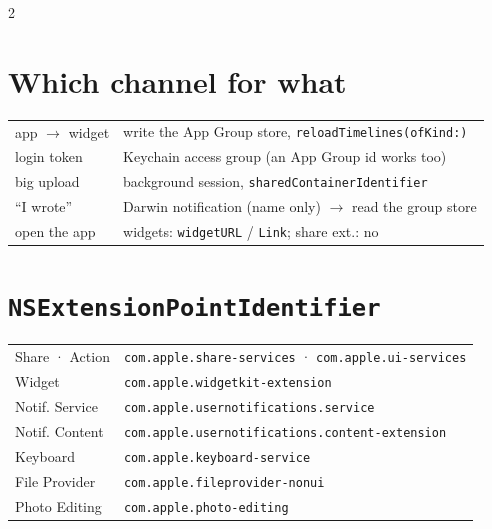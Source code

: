 \documentclass[8pt]{extarticle}
\begin{document}
\begin{multicols}{2}
\section{Which channel for what}
{\footnotesize
\begin{tabular}{@{}>{\raggedright\arraybackslash}p{24mm}>{\raggedright\arraybackslash}p{51mm}@{}}
\toprule
app $\to$ widget & write the App Group store, \texttt{reloadTimelines(ofKind:)} \\
login token & Keychain access group (an App Group id works too) \\
big upload & background session, \texttt{sharedContainerIdentifier} \\
``I wrote'' & Darwin notification (name only) $\to$ read the group store \\
open the app & widgets: \texttt{widgetURL} / \texttt{Link}; share ext.: no \\
\bottomrule
\end{tabular}}

\section{\texttt{NSExtensionPointIdentifier}}
{\footnotesize
\begin{tabular}{@{}l l@{}}
Share · Action & \texttt{com.apple.share-services} · \texttt{com.apple.ui-services} \\
Widget & \texttt{com.apple.widgetkit-extension} \\
Notif. Service & \texttt{com.apple.usernotifications.service} \\
Notif. Content & \texttt{com.apple.usernotifications.content-extension} \\
Keyboard & \texttt{com.apple.keyboard-service} \\
File Provider & \texttt{com.apple.fileprovider-nonui} \\
Photo Editing & \texttt{com.apple.photo-editing} \\
\end{tabular}}

\end{multicols}

\end{document}
